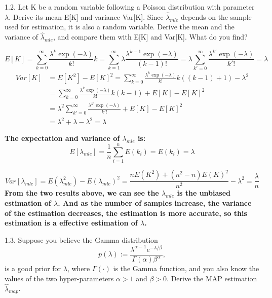 \documentclass{article}
\theoremstyle{definition}
\theoremstyle{definition}
\theoremstyle{remark}
\begin{document}
1.2. Let K be a random variable following a Poisson distribution with parameter $\lambda$. Derive its mean E[K] and variance Var[K]. Since $\hat{\lambda}_{mle}$
depends on the sample used for estimation, it is also a random variable. Derive the mean and the variance of $\hat{\lambda}_{mle}$, and compare them with E[K]
and Var[K]. What do you find?

\begin{addmargin}[3em]{2em}
  \[
  E[K] = \sum_{k=0}^{\infty} \frac{\lambda^k \exp(-\lambda)}{k!} k = \sum_{k=1}^{\infty} \lambda \frac{\lambda^{k-1} \exp(-\lambda)}{(k-1)!} = \lambda \sum_{k'=0}^{\infty} \frac{\lambda^{k'} \exp(-\lambda)}{k'!} = \lambda
  \]
  \[
  \begin{split}
    Var[K] & = E[K^2] - {E[K]}^2 = \sum_{k=0}^{\infty} \frac{\lambda^k \exp(-\lambda)}{k!} k((k-1) + 1) - \lambda^2 \\
    & = \sum_{k=0}^{\infty} \frac{\lambda^k \exp(-\lambda)}{k!} k(k-1) + E[K] - {E[K]}^2 \\
    & = \lambda^2 \sum_{k'=0}^{\infty} \frac{\lambda^{k'} \exp(-\lambda)}{k'!} + E[K] - {E[K]}^2 \\
    & = \lambda^2 + \lambda - \lambda^2 = \lambda
  \end{split}
  \]

\textbf{The expectation and variance of $\lambda_{mle}$ is:}
\[
E[\lambda_{mle}] = \frac{1}{n} \sum_{i=1}^n E(k_i) = E(k_i) = \lambda
\]

\[
Var[\lambda_{mle}] = E(\lambda_{mle}^2) - {E(\lambda_{mle})}^2 = \frac{nE(K^2) + (n^2 - n)E(K)^2}{n^2} -\lambda^2 = \frac{\lambda}{n}
\]
\textbf{From the two results above, we can see the $\lambda_{mle}$ is the unbiased estimation of $\lambda$. And as the number of samples increase, the variance of the estimation decreases, the estimation is more accurate, so this estimation is a effective estimation of $\lambda$.}
\end{addmargin}

1.3. Suppose you believe the Gamma distribution
\begin{equation}
p(\lambda) := \frac{\lambda^{\alpha-1}e^{-\lambda/\beta}}{\Gamma(\alpha)\beta^\alpha},
\end{equation}
is a good prior for $\lambda$, where $\Gamma(\cdot)$ is the Gamma function, and you also know the values of the two hyper-parameters $\alpha>1$ and
$\beta>0$. Derive the MAP estimation $\hat{\lambda}_{map}$.
\end{document}
